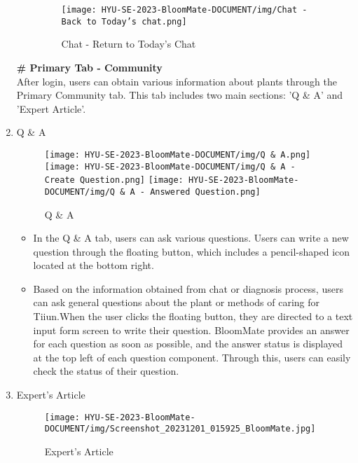 \documentclass[conference, a4paper]{IEEEtran}
\begin{document}
\begin{enumerate}
\begin{itemize}
        \begin{figure}[h]
        \centerline{
            \texttt{[image: HYU-SE-2023-BloomMate-DOCUMENT/img/Chat - Back to Today's chat.png]}
        }
        \label{fig}
        \caption{Chat - Return to Today's Chat}
        \end{figure}
    \end{itemize}
\newline
\textbf{\# Primary Tab - Community}
\\After login, users can obtain various information about plants through the Primary Community tab. This tab includes two main sections: 'Q \& A' and 'Expert Article'.\\
\item Q \& A
        \begin{figure}[h]
        \centerline{
            \texttt{[image: HYU-SE-2023-BloomMate-DOCUMENT/img/Q \& A.png]}
            \texttt{[image: HYU-SE-2023-BloomMate-DOCUMENT/img/Q \& A - Create Question.png]}
            \texttt{[image: HYU-SE-2023-BloomMate-DOCUMENT/img/Q \& A - Answered Question.png]}
        }
        \label{fig}
        \caption{Q \& A}
        \end{figure}
        \begin{itemize}
            \item In the Q \& A tab, users can ask various questions. Users can write a new question through the floating button, which includes a pencil-shaped icon located at the bottom right.
            \item Based on the information obtained from chat or diagnosis process, users can ask general questions about the plant or methods of caring for Tiiun.When the user clicks the floating button, they are directed to a text input form screen to write their question. BloomMate provides an answer for each question as soon as possible, and the answer status is displayed at the top left of each question component. Through this, users can easily check the status of their question.
        \end{itemize}
    \item Expert’s Article
        \begin{figure}[h]
        \centerline{
            \texttt{[image: HYU-SE-2023-BloomMate-DOCUMENT/img/Screenshot\_20231201\_015925\_BloomMate.jpg]}
        }
        \label{fig}
        \caption{Expert's Article}
        \end{figure}

\end{enumerate}
\end{document}
